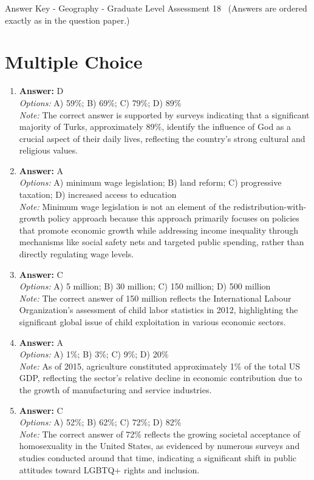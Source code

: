 \documentclass[12pt]{article}
\begin{document}
\begin{center}
Answer Key - Geography - Graduate Level Assessment 18 \
\small (Answers are ordered exactly as in the question paper.)
\end{center}

\section*{Multiple Choice}
\begin{enumerate}[label=\arabic*.]
\item \textbf{Answer:} D
\\ \textit{Options:} A) 59\%; B) 69\%; C) 79\%; D) 89\%
\\ \textit{Note:} The correct answer is supported by surveys indicating that a significant majority of Turks, approximately 89\%, identify the influence of God as a crucial aspect of their daily lives, reflecting the country's strong cultural and religious values.
\item \textbf{Answer:} A
\\ \textit{Options:} A) minimum wage legislation; B) land reform; C) progressive taxation; D) increased access to education
\\ \textit{Note:} Minimum wage legislation is not an element of the redistribution-with-growth policy approach because this approach primarily focuses on policies that promote economic growth while addressing income inequality through mechanisms like social safety nets and targeted public spending, rather than directly regulating wage levels.
\item \textbf{Answer:} C
\\ \textit{Options:} A) 5 million; B) 30 million; C) 150 million; D) 500 million
\\ \textit{Note:} The correct answer of 150 million reflects the International Labour Organization's assessment of child labor statistics in 2012, highlighting the significant global issue of child exploitation in various economic sectors.
\item \textbf{Answer:} A
\\ \textit{Options:} A) 1\%; B) 3\%; C) 9\%; D) 20\%
\\ \textit{Note:} As of 2015, agriculture constituted approximately 1\% of the total US GDP, reflecting the sector's relative decline in economic contribution due to the growth of manufacturing and service industries.
\item \textbf{Answer:} C
\\ \textit{Options:} A) 52\%; B) 62\%; C) 72\%; D) 82\%
\\ \textit{Note:} The correct answer of 72\% reflects the growing societal acceptance of homosexuality in the United States, as evidenced by numerous surveys and studies conducted around that time, indicating a significant shift in public attitudes toward LGBTQ+ rights and inclusion.
\end{enumerate}
\end{document}
